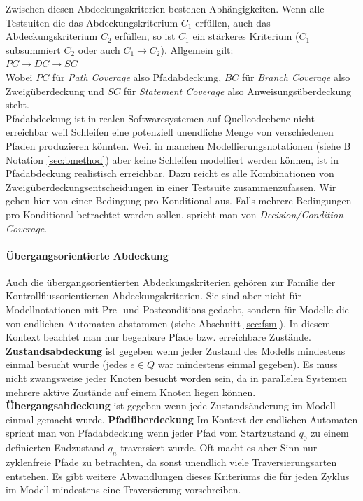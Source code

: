 Zwischen diesen Abdeckungskriterien bestehen Abhängigkeiten. Wenn alle Testsuiten die das Abdeckungskriterium $C_1$ erfüllen, auch das Abdeckungskriterium $C_2$ erfüllen, so ist $C_1$ ein stärkeres Kriterium ($C_1$ subsummiert $C_2$ oder auch $C_1 \longrightarrow C_2$). Allgemein gilt:\\
$ PC \longrightarrow DC \longrightarrow SC $\\
Wobei $PC$ für \textit{Path Coverage} also Pfadabdeckung, $BC$ für \textit{Branch Coverage} also Zweigüberdeckung und $SC$ für \textit{Statement Coverage} also Anweisungsüberdeckung steht.\\
Pfadabdeckung ist in realen Softwaresystemen auf Quellcodeebene nicht erreichbar\cite{utting_practical_2007} weil Schleifen eine potenziell unendliche Menge von verschiedenen Pfaden produzieren könnten. Weil in manchen Modellierungsnotationen (siehe B Notation \ref{sec:bmethod}) aber keine Schleifen modelliert werden können, ist in Pfadabdeckung realistisch erreichbar. Dazu reicht es alle Kombinationen von Zweigüberdeckungsentscheidungen in einer Testsuite zusammenzufassen. Wir gehen hier von einer Bedingung pro Konditional aus. Falls mehrere Bedingungen pro Konditional betrachtet werden sollen, spricht man von \textit{Decision/Condition Coverage}.

\paragraph{Übergangsorientierte Abdeckung}
Auch die übergangsorientierten Abdeckungskriterien gehören zur Familie der Kontrollflussorientierten Abdeckungskriterien. Sie sind aber nicht für Modellnotationen mit Pre- und Postconditions gedacht, sondern für Modelle die von endlichen Automaten abstammen (siehe Abschnitt \ref{sec:fsm}). In diesem Kontext beachtet man nur begehbare Pfade bzw. erreichbare Zustände.\\

\textbf{Zustandsabdeckung} ist gegeben wenn jeder Zustand des Modells mindestens einmal besucht wurde (jedes $e \in Q$ war mindestens einmal gegeben). Es muss nicht zwangsweise jeder Knoten besucht worden sein, da in parallelen Systemen mehrere aktive Zustände auf einem Knoten liegen können.
\textbf{Übergangsabdeckung} ist gegeben wenn jede Zustandsänderung im Modell einmal gemacht wurde.
\textbf{Pfadüberdeckung} Im Kontext der endlichen Automaten spricht man von Pfadabdeckung wenn jeder Pfad vom Startzustand $q_0$ zu einem definierten Endzustand $q_n$ traversiert wurde. Oft macht es aber Sinn nur zyklenfreie Pfade zu betrachten, da sonst unendlich viele Traversierungsarten entstehen. Es gibt weitere Abwandlungen dieses Kriteriums die für jeden Zyklus im Modell mindestens eine Traversierung vorschreiben.

